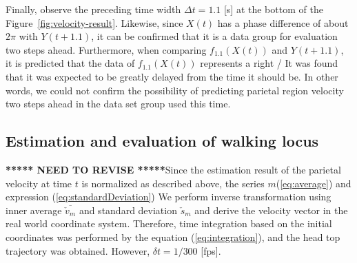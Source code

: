 \documentclass{sigchi}
\begin{document}
Finally, observe the preceding time width $ \Delta t = 1.1 $ [s] at the bottom of the Figure~\ref{fig:velocity-result}. Likewise, since $ X (t) $ has a phase difference of about $ 2 \pi $ with $ Y (t + 1.1) $, it can be confirmed that it is a data group for evaluation two steps ahead. Furthermore, when comparing $ f_ {1.1} (X (t)) $ and $ Y (t + 1.1) $, it is predicted that the data of $ f_ {1.1} (X (t)) $ represents a right / It was found that it was expected to be greatly delayed from the time it should be. In other words, we could not confirm the possibility of predicting parietal region velocity two steps ahead in the data set group used this time.


\subsection{Estimation and evaluation of walking locus}

{\bf ****** NEED TO REVISE *****}Since the estimation result of the parietal velocity at time $ t $ is normalized as described above, the series $ m $(\ref {eq:average}) and expression (\ref {eq:standardDeviation}) We perform inverse transformation using inner average $ \overline {\check {v} _ {m}} $ and standard deviation $ \check {s} _ m $ and derive the velocity vector in the real world coordinate system. Therefore, time integration based on the initial coordinates was performed by the equation (\ref {eq:integration}), and the head top trajectory was obtained. However, $ \delta t = 1/300 $ [fps].
\end{document}
